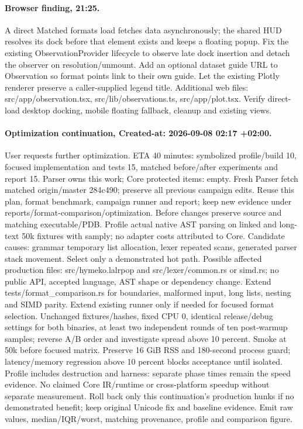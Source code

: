 \documentclass[11pt,a4paper]{article}
\begin{document}
\paragraph{Browser finding, 21:25.} A direct Matched formats load fetches data
asynchronously; the shared HUD resolves its dock before that element exists and
keeps a floating popup. Fix the existing ObservationProvider lifecycle to observe
late dock insertion and detach the observer on resolution/unmount. Add an optional
dataset guide URL to Observation so format points link to their own guide. Let the
existing Plotly renderer preserve a caller-supplied legend title. Additional web
files: src/app/observation.tsx, src/lib/observations.ts, src/app/plot.tsx. Verify
direct-load desktop docking, mobile floating fallback, cleanup and existing views.
\paragraph{Optimization continuation, Created-at: 2026-09-08 02:17 +02:00.}
User requests further optimization. ETA 40 minutes: symbolized profile/build 10,
focused implementation and tests 15, matched before/after experiments and report 15.
Parser owns this work; Core protected items: empty. Fresh Parser fetch matched
origin/master 284c490; preserve all previous campaign edits. Reuse this plan,
format benchmark, campaign runner and report; keep new evidence under
reports/format-comparison/optimization. Before changes preserve source and matching
executable/PDB. Profile actual native AST parsing on linked and long-text 50k
fixtures with samply; no adapter costs attributed to Core. Candidate causes:
grammar temporary list allocation, lexer repeated scans, generated parser stack
movement. Select only a demonstrated hot path. Possible affected production files:
src/hymeko.lalrpop and src/lexer/common.rs or simd.rs; no public API, accepted
language, AST shape or dependency change. Extend tests/format\_comparison.rs for
boundaries, malformed input, long lists, nesting and SIMD parity. Extend existing
runner only if needed for focused format selection. Unchanged fixtures/hashes,
fixed CPU 0, identical release/debug settings for both binaries, at least two
independent rounds of ten post-warmup samples; reverse A/B order and investigate
spread above 10 percent. Smoke at 50k before focused matrix. Preserve 16 GiB RSS
and 180-second process guard; latency/memory regression above 10 percent blocks
acceptance until isolated. Profile includes destruction and harness: separate
phase times remain the speed evidence. No claimed Core IR/runtime or cross-platform
speedup without separate measurement. Roll back only this continuation's production
hunks if no demonstrated benefit; keep original Unicode fix and baseline evidence.
Emit raw values, median/IQR/worst, matching provenance, profile and comparison figure.
\end{document}
